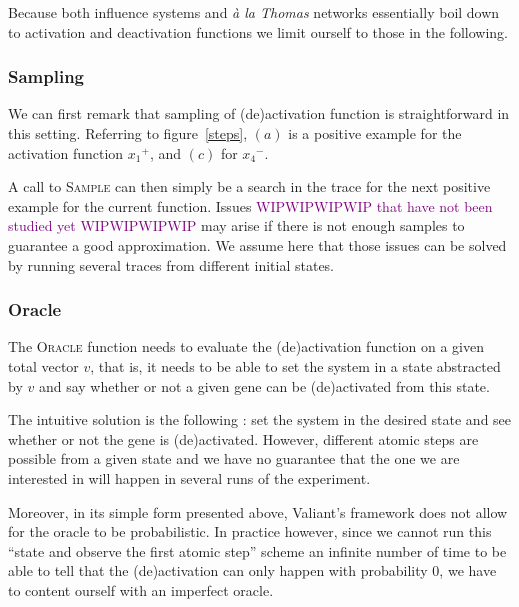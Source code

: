 \documentclass{llncs}
\newcommand{\wip}[1]{\textcolor{Purple}{WIPWIPWIPWIP #1 WIPWIPWIPWIP}}
\begin{document}
Because both influence systems and \textit{\`{a} la Thomas} networks essentially boil down to activation and deactivation functions we limit ourself to those in the following.

\subsubsection{Sampling}

We can first remark that sampling of (de)activation function is straightforward in this setting. Referring to figure~\ref{steps}, $(a)$ is a positive example for the activation function ${x_1}^+$, and $(c)$ for ${x_4}^-$.

A call to \textsc{Sample} can then simply be a search in the trace for the next positive example for the current function. Issues \wip{that have not been studied yet} may arise if there is not enough samples to guarantee a good approximation. 
We assume here that those issues can be solved by running several traces from different initial states.

\subsubsection{Oracle}
The \textsc{Oracle} function needs to evaluate the (de)activation function on a given total vector $v$, that is, it needs to be able to set the system in a state abstracted by $v$ and say whether or not a given gene can be (de)activated from this state.

The intuitive solution is the following : set the system in the desired state and see whether or not the gene is (de)activated. 
However, different atomic steps are possible from a given state and we have no guarantee that the one we are interested in will happen
in several runs of the experiment. 

Moreover, in its simple form presented above, %
Valiant's framework does not allow for the oracle to be probabilistic.
In practice however, since we cannot run this ``state and observe the first atomic step'' scheme an infinite number of time to be able to tell that the (de)activation can only happen with probability 0,
we have to content ourself with an imperfect oracle.
\end{document}
